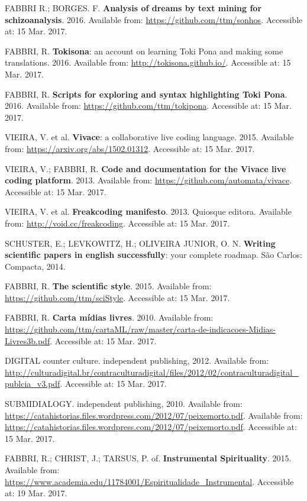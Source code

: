\documentclass[
12pt,		%
openright,	%
twoside,  %
a4paper,			%
chapter=TITLE,		%
english,			%
french,				%
spanish,			%
brazil				%
]{USPSC}
\begin{document}
\begin{thebibliography}{999}
	FABBRI R.; BORGES. F. \textbf{Analysis of dreams by text mining for schizoanalysis}. 2016. Available from: \url{https://github.com/ttm/sonhos}. Accessible at: 15 Mar. 2017.

	FABBRI, R. \textbf{Tokisona}: an account on learning Toki Pona and making some translations. 2016. Available from: \url{http://tokisona.github.io/}. Accessible at: 15 Mar. 2017.

	FABBRI, R. \textbf{Scripts for exploring and syntax highlighting Toki Pona}. 2016. Available from: \url{https://github.com/ttm/tokipona}. Accessible at: 15 Mar. 2017.

	VIEIRA, V. et al. \textbf{Vivace}: a collaborative live coding language. 2015. Available from: \url{https://arxiv.org/abs/1502.01312}. Accessible at: 15 Mar. 2017.

	VIEIRA, V.; FABBRI, R. \textbf{Code and documentation for the Vivace live coding platform}. 2013. Available from: \url{https://github.com/automata/vivace}. Accessible at: 15 Mar. 2017.

	VIEIRA, V. et al. \textbf{Freakcoding manifesto}. 2013. Quiosque editora. Available from: \url{http://void.cc/freakcoding}. Accessible at: 15 Mar. 2017.

	SCHUSTER, E.; LEVKOWITZ, H.; OLIVEIRA JUNIOR, O. N. \textbf{Writing scientific papers in english successfully}: your complete roadmap. São Carlos: Compacta, 2014.

	FABBRI, R. \textbf{The scientific style}. 2015. Available from: \url{https://github.com/ttm/sciStyle}. Accessible at: 15 Mar. 2017.

	FABBRI, R. \textbf{Carta mídias livres}. 2010. Available from: \url{https://github.com/ttm/cartaML/raw/master/carta-de-indicacoes-Midias-Livres3b.pdf}. Accessible at: 15 Mar. 2017.

	DIGITAL counter culture. independent publishing, 2012. Available from: \url{http://culturadigital.br/contraculturadigital/files/2012/02/contraculturadigital_publcia_v3.pdf}. Accessible at: 15 Mar. 2017.

	SUBMIDIALOGY. independent publishing, 2010. Available from: \url{https://catahistorias.files.wordpress.com/2012/07/peixemorto.pdf}. Available from: \url{https://catahistorias.files.wordpress.com/2012/07/peixemorto.pdf}. Accessible at: 15 Mar. 2017.

	FABBRI, R.; CHRIST, J.; TARSUS, P. of. \textbf{Instrumental Spirituality}. 2015. Available from: \url{https://www.academia.edu/11784001/Espiritualidade_Instrumental}. Accessible at: 19 Mar. 2017.

\end{thebibliography}
\end{document}
